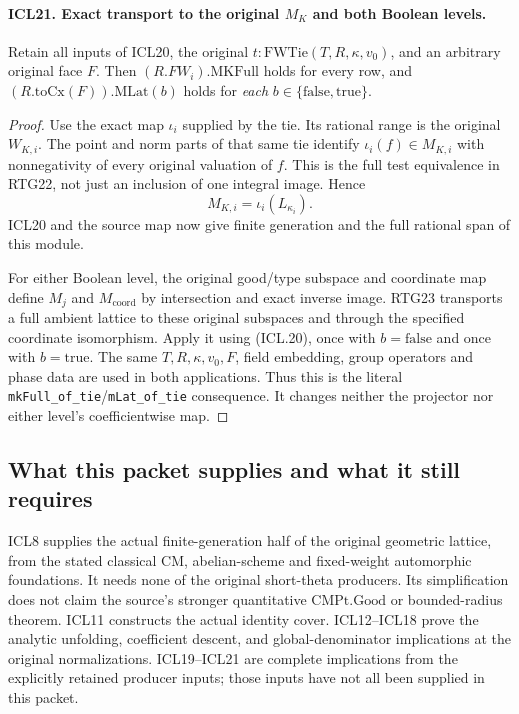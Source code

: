 \paragraph{ICL21. Exact transport to the original \(M_K\) and both Boolean levels.}
\label{claim:ICL21}
Retain all inputs of ICL20, the original
\(t:\mathrm{FWTie}(T,R,\kappa,v_0)\), and an
arbitrary original face \(F\).  Then
\((R.FW_i).\mathrm{MKFull}\) holds for every row,
and \((R.\mathrm{toCx}(F)).\mathrm{MLat}(b)\)
holds for \emph{each} \(b\in\{\mathrm{false},
\mathrm{true}\}\).
\begin{proof}
Use the exact map \(\iota_i\) supplied by the tie.
Its rational range is the original \(W_{K,i}\).
The point and norm parts of that same tie identify
\(\iota_i(f)\in M_{K,i}\) with nonnegativity of
every original valuation of \(f\).  This is the
full test equivalence in RTG22, not just an
inclusion of one integral image.  Hence
\[
 M_{K,i}=\iota_i(L_{\kappa_i}).                         \tag{ICL.20}
\]
ICL20 and the source map now give finite generation
and the full rational span of this module.

For either Boolean level, the original good/type
subspace and coordinate map define \(M_j\) and
\(M_{\mathrm{coord}}\) by intersection and exact
inverse image.  RTG23 transports a full ambient
lattice to these original subspaces and through
the specified coordinate isomorphism.  Apply it
using (ICL.20), once with \(b=\mathrm{false}\)
and once with \(b=\mathrm{true}\).  The same
\(T,R,\kappa,v_0,F\), field embedding, group
operators and phase data are used in both
applications.  Thus this is the literal
\texttt{mkFull\_of\_tie}/\texttt{mLat\_of\_tie}
consequence.  It changes neither the projector
nor either level's coefficientwise map.
\end{proof}

\subsection{What this packet supplies and what it still requires}

ICL8 supplies the actual finite-generation half of
the original geometric lattice, from the stated
classical CM, abelian-scheme and fixed-weight
automorphic foundations.  It needs none of the
original short-theta producers.  Its simplification
does not claim the source's stronger quantitative
\(\mathrm{CMPt.Good}\) or bounded-radius theorem.
ICL11 constructs the actual identity cover.  ICL12--ICL18
prove the analytic unfolding, coefficient descent,
and global-denominator implications at the original
normalizations.  ICL19--ICL21 are complete implications
from the explicitly retained producer inputs; those
inputs have not all been supplied in this packet.

